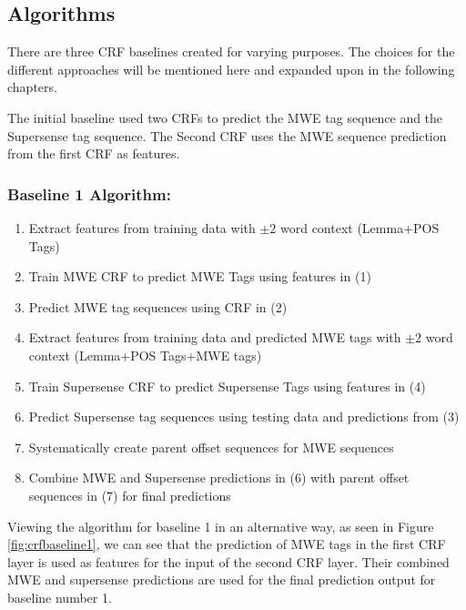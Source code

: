 \subsection{Algorithms}
There are three CRF baselines created for varying purposes. The choices for the different approaches will be mentioned here and expanded upon in the following chapters.

The initial baseline used two CRFs to predict the MWE tag sequence and the Supersense tag sequence. The Second CRF uses the MWE sequence prediction from the first CRF as features. 

\subsubsection{Baseline 1 Algorithm:}
\begin{mdframed}[
    linewidth=0pt,
    roundcorner=4pt,
    backgroundcolor=gray!15,
    userdefinedwidth=\textwidth,
]
\begin{enumerate}
\tiny
  \setlength{\itemsep}{0pt}
  \setlength{\parskip}{0pt}
\item Extract features from training data with $\pm 2$ word context (Lemma+POS Tags)
\item Train MWE CRF to predict MWE Tags using features in (1)
\item Predict MWE tag sequences using CRF in (2)
\item Extract features from training data and predicted MWE tags with $\pm 2$ word context (Lemma+POS Tags+MWE tags)
\item Train Supersense CRF to predict Supersense Tags using features in (4)
\item Predict Supersense tag sequences using testing data and predictions from (3)
\item Systematically create parent offset sequences for MWE sequences
\item Combine MWE and Supersense predictions in (6) with parent offset sequences in (7) for final predictions
\end{enumerate}
\end{mdframed}

Viewing the algorithm for baseline 1 in an alternative way, as seen in Figure \ref{fig:crfbaseline1}, we can see that the prediction of MWE tags in the first CRF layer is used as features for the input of the second CRF layer. Their combined MWE and supersense predictions are used for the final prediction output for baseline number 1.


